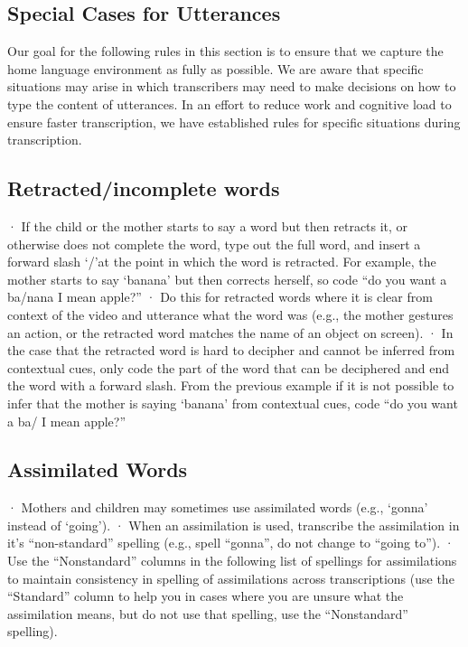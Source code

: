\documentclass[
]{book}
\begin{document}
\hypertarget{special-cases-for-utterances}{%
\subsection{Special Cases for Utterances}\label{special-cases-for-utterances}}

Our goal for the following rules in this section is to ensure that we capture the home language environment as fully as possible. We are aware that specific situations may arise in which transcribers may need to make decisions on how to type the content of utterances. In an effort to reduce work and cognitive load to ensure faster transcription, we have established rules for specific situations during transcription.

\hypertarget{retractedincomplete-words}{%
\subsection{Retracted/incomplete words}\label{retractedincomplete-words}}

· If the child or the mother starts to say a word but then retracts it, or otherwise does not complete the word, type out the full word, and insert a forward slash `/'at the point in which the word is retracted. For example, the mother starts to say `banana' but then corrects herself, so code ``do you want a ba/nana I mean apple?''
· Do this for retracted words where it is clear from context of the video and utterance what the word was (e.g., the mother gestures an action, or the retracted word matches the name of an object on screen).
· In the case that the retracted word is hard to decipher and cannot be inferred from contextual cues, only code the part of the word that can be deciphered and end the word with a forward slash. From the previous example if it is not possible to infer that the mother is saying `banana' from contextual cues, code ``do you want a ba/ I mean apple?''

\hypertarget{assimilated-words}{%
\subsection{Assimilated Words}\label{assimilated-words}}

· Mothers and children may sometimes use assimilated words (e.g., `gonna' instead of `going').
· When an assimilation is used, transcribe the assimilation in it's ``non-standard'' spelling (e.g., spell ``gonna'', do not change to ``going to'').
· Use the ``Nonstandard'' columns in the following list of spellings for assimilations to maintain consistency in spelling of assimilations across transcriptions (use the ``Standard'' column to help you in cases where you are unsure what the assimilation means, but do not use that spelling, use the ``Nonstandard'' spelling).
\end{document}
